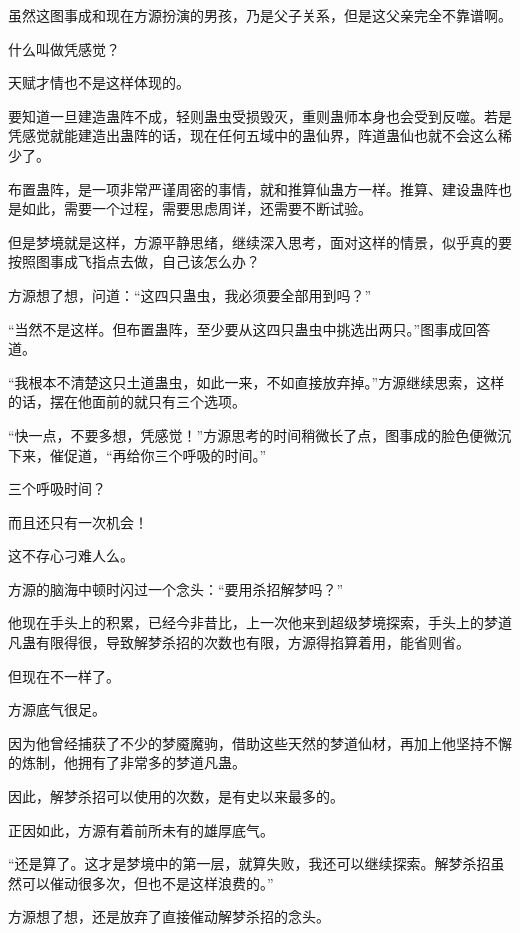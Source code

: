 
\begin{this_body}

虽然这图事成和现在方源扮演的男孩，乃是父子关系，但是这父亲完全不靠谱啊。

什么叫做凭感觉？

天赋才情也不是这样体现的。

要知道一旦建造蛊阵不成，轻则蛊虫受损毁灭，重则蛊师本身也会受到反噬。若是凭感觉就能建造出蛊阵的话，现在任何五域中的蛊仙界，阵道蛊仙也就不会这么稀少了。

布置蛊阵，是一项非常严谨周密的事情，就和推算仙蛊方一样。推算、建设蛊阵也是如此，需要一个过程，需要思虑周详，还需要不断试验。

但是梦境就是这样，方源平静思绪，继续深入思考，面对这样的情景，似乎真的要按照图事成飞指点去做，自己该怎么办？

方源想了想，问道：“这四只蛊虫，我必须要全部用到吗？”

“当然不是这样。但布置蛊阵，至少要从这四只蛊虫中挑选出两只。”图事成回答道。

“我根本不清楚这只土道蛊虫，如此一来，不如直接放弃掉。”方源继续思索，这样的话，摆在他面前的就只有三个选项。

“快一点，不要多想，凭感觉！”方源思考的时间稍微长了点，图事成的脸色便微沉下来，催促道，“再给你三个呼吸的时间。”

三个呼吸时间？

而且还只有一次机会！

这不存心刁难人么。

方源的脑海中顿时闪过一个念头：“要用杀招解梦吗？”

他现在手头上的积累，已经今非昔比，上一次他来到超级梦境探索，手头上的梦道凡蛊有限得很，导致解梦杀招的次数也有限，方源得掐算着用，能省则省。

但现在不一样了。

方源底气很足。

因为他曾经捕获了不少的梦魇魔驹，借助这些天然的梦道仙材，再加上他坚持不懈的炼制，他拥有了非常多的梦道凡蛊。

因此，解梦杀招可以使用的次数，是有史以来最多的。

正因如此，方源有着前所未有的雄厚底气。

“还是算了。这才是梦境中的第一层，就算失败，我还可以继续探索。解梦杀招虽然可以催动很多次，但也不是这样浪费的。”

方源想了想，还是放弃了直接催动解梦杀招的念头。


\end{this_body}
